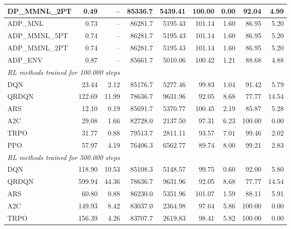 \begin{samepage}
\begin{center}
\begin{tabular}{l|rr|rr|rr|rr}
    DP\_MMNL\_2PT &     0.49 &    -- &    85336.7 &    5439.41 &  100.00 &    0.00 &   92.04 &    4.99 \\
    \midrule
    ADP\_MNL     &     0.73 &    -- &    86281.7 &    5195.43 &  101.14 &    1.60 &   86.95 &    5.20 \\
    ADP\_MMNL\_5PT &     0.74 &    -- &    86281.7 &    5195.43 &  101.14 &    1.60 &   86.95 &    5.20 \\
    ADP\_MMNL\_2PT &     0.74 &    -- &    86281.7 &    5195.43 &  101.14 &    1.60 &   86.95 &    5.20 \\
    ADP\_ENV     &     0.87 &    -- &    85661.7 &    5010.06 &  100.42 &    1.21 &   88.68 &    4.88 \\
    \midrule
    \multicolumn{9}{l}{\textit{RL methods trained for 100.000 steps}} \\
    \midrule
    DQN          &    23.44 &     2.12 &    85176.7 &    5277.46 &   99.83 &    1.04 &   91.42 &    5.79 \\
    QRDQN        &   122.69 &    11.99 &    78636.7 &    9631.96 &   92.05 &    8.68 &   77.77 &   14.54 \\
    ARS          &    12.10 &     0.19 &    85691.7 &    5370.77 &  100.45 &    2.19 &   85.87 &    5.28 \\
    A2C          &    29.08 &     1.66 &    82728.0 &    2137.50 &   97.31 &    6.23 &  100.00 &    0.00 \\
    TRPO         &    31.77 &     0.88 &    79513.7 &    2811.11 &   93.57 &    7.01 &   99.46 &    2.02 \\
    PPO          &    57.97 &     4.19 &    76406.3 &    6562.77 &   89.74 &    8.00 &   99.21 &    2.83 \\
    \midrule
    \multicolumn{9}{l}{\textit{RL methods trained for 500.000 steps}} \\
    \midrule
    DQN          &   118.90 &    10.53 &    85108.3 &    5148.57 &   99.75 &    0.60 &   92.00 &    5.80 \\
    QRDQN        &   599.94 &    44.36 &    78636.7 &    9631.96 &   92.05 &    8.68 &   77.77 &   14.54 \\
    ARS          &    60.80 &     0.88 &    86230.0 &    5351.96 &  101.07 &    1.59 &   88.11 &    5.91 \\
    A2C          &   149.93 &     8.42 &    83037.0 &    2364.98 &   97.64 &    5.86 &  100.00 &    0.00 \\
    TRPO         &   156.39 &     4.26 &    83707.7 &    2619.83 &   98.41 &    5.82 &  100.00 &    0.00 \\

\end{tabular}
\end{center}
\end{samepage}

